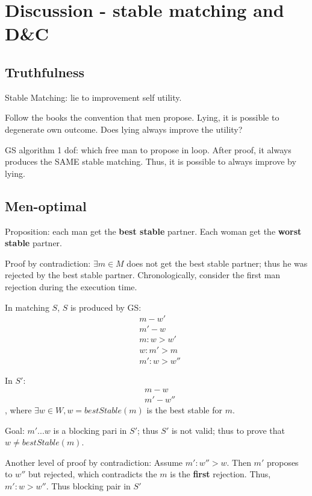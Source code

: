 \documentclass[a4paper]{report}
\begin{document}
\section*{Discussion - stable matching and D\&C}
\subsection*{Truthfulness}
Stable Matching: lie to improvement self utility.

Follow the books the convention that men propose. Lying, it is possible to degenerate own outcome. Does lying always improve the utility? 

GS algorithm 1 dof: which free man to propose in  loop. After proof, it always produces the SAME stable matching. Thus, it is possible to always improve by lying. 

\subsection*{Men-optimal}
Proposition: each man get the\textbf{ best stable} partner. Each woman get the \textbf{worst stable} partner. 

Proof by contradiction: $\exists m\in M$ does not get the best stable partner; thus he was rejected by the best stable partner. Chronologically, consider the first man rejection during the execution time. 

In matching $S$, $S$ is produced by GS:
\begin{align*}
& m-w'\\
& m'-w\\
& m: w >w'\\
& w: m' > m\\
&m': w > w''
\end{align*}

In $S'$: 
\begin{align*}
& m-w\\
& m'-w''
\end{align*}
, where $\exists w\in W, w=bestStable(m)$ is the best stable for $m$. 



Goal: $m'... w$ is a blocking pari in $S'$; thus $S'$ is not valid; thus to prove that $w\neq bestStable(m)$. 

Another level of proof by contradiction: 
Assume $m': w'' >w$. Then $m'$ proposes to $w''$ but rejected, which contradicts the $m$ is the \textbf{first} rejection. Thus, $m': w>w''$. Thus blocking pair in $S'$
\end{document}

